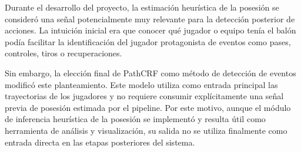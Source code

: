 Durante el desarrollo del proyecto, la estimación heurística de la posesión se consideró una señal potencialmente muy relevante para la detección posterior de acciones. La intuición inicial era que conocer qué jugador o equipo tenía el balón podía facilitar la identificación del jugador protagonista de eventos como pases, controles, tiros o recuperaciones.

Sin embargo, la elección final de PathCRF como método de detección de eventos modificó este planteamiento. Este modelo utiliza como entrada principal las trayectorias de los jugadores y no requiere consumir explícitamente una señal previa de posesión estimada por el pipeline. Por este motivo, aunque el módulo de inferencia heurística de la posesión se implementó y resulta útil como herramienta de análisis y visualización, su salida no se utiliza finalmente como entrada directa en las etapas posteriores del sistema.
